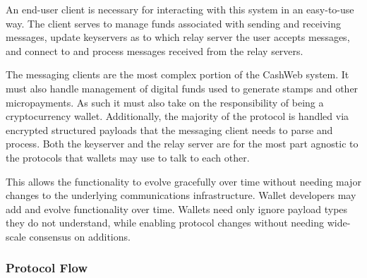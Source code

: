 \documentclass{article}
\begin{document}
An end-user client is necessary for interacting with this system in an easy-to-use way. The client serves to manage funds associated with sending and receiving messages, update keyservers as to which relay server the user accepts messages, and connect to and process messages received from the relay servers.

The messaging clients are the most complex portion of the CashWeb system. It must also handle management of digital funds used to generate stamps and other micropayments. As such it must also take on the responsibility of being a cryptocurrency wallet. Additionally, the majority of the protocol is handled via encrypted structured payloads that the messaging client needs to parse and process. Both the keyserver and the relay server are for the most part agnostic to the protocols that wallets may use to talk to each other.

This allows the functionality to evolve gracefully over time without needing major changes to the underlying communications infrastructure. Wallet developers may add and evolve functionality over time. Wallets need only ignore payload types they do not understand, while enabling protocol changes without needing wide-scale consensus on additions.

\subsubsection{Protocol Flow}

\begin{figure}[H]
  \begin{center}
  \end{center}
\end{figure}
\end{document}
